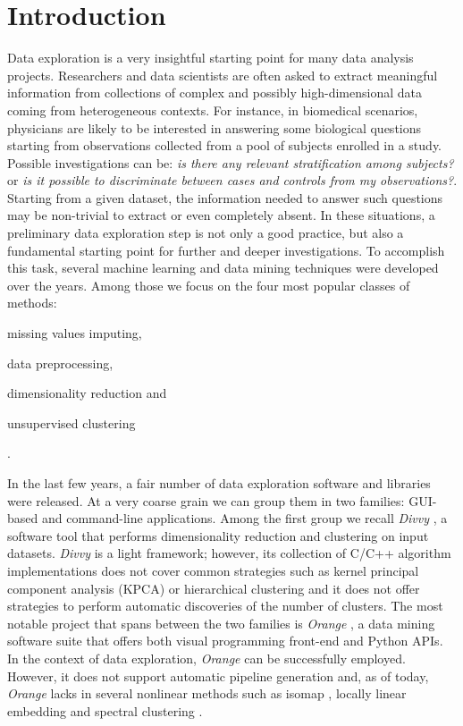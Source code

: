 \documentclass[twoside,11pt]{article}
\makeatletter
\newcommand{\py}{{Python}\@\xspace}
\makeatother
\begin{document}
\section{Introduction}\label{sec:intro}
Data exploration is a very insightful starting point for many data analysis projects. Researchers and data scientists are often asked to extract meaningful information from collections of complex and possibly high-dimensional data coming from heterogeneous contexts. For instance, in biomedical scenarios, physicians are likely to be interested in answering some biological questions starting from observations collected from a pool of subjects enrolled in a study. Possible investigations can be: \emph{is there any relevant stratification among subjects?} or \emph{is it possible to discriminate between cases and controls from my observations?}. Starting from a given dataset, the information needed to answer such questions may be non-trivial to extract or even completely absent.
In these situations, a preliminary data exploration step is not only a good practice, but also a fundamental starting point for further and deeper investigations. To accomplish this task, several machine learning and data mining techniques were developed over the years. 
Among those we focus on the four most popular classes of methods: \begin{enumerate*}[label=(\roman*)]
  \item missing values imputing,
  \item data preprocessing,
  \item dimensionality reduction and
  \item unsupervised clustering
\end{enumerate*}.

In the last few years, a fair number of data exploration software and libraries were released. At a very coarse grain we can group them in two families: GUI-based and command-line applications. 
Among the first group we recall \emph{Divvy} \citep{lewis2013divvy}, a software tool that performs dimensionality reduction and clustering on input datasets. \emph{Divvy} is a light framework; however, 
its collection of {C/C++} algorithm implementations does not cover common strategies such as kernel principal component analysis (KPCA) \citep{scholkopf1997kernel} or hierarchical clustering \citep{friedman2001elements} and it does not offer strategies to perform automatic discoveries of the number of clusters. 
The most notable project that spans between the two families is \emph{Orange} \citep{demvsar2013orange}, a data mining software suite that offers both visual programming front-end and \py APIs. In the context of data exploration, \emph{Orange} can be successfully employed. However, it does not support automatic pipeline generation
and, as of today, \emph{Orange} lacks in several nonlinear methods such as isomap \citep{tenenbaum2000global}, locally linear embedding \citep{roweis2000nonlinear} and spectral clustering \citep{shi2000normalized}.
\end{document}
